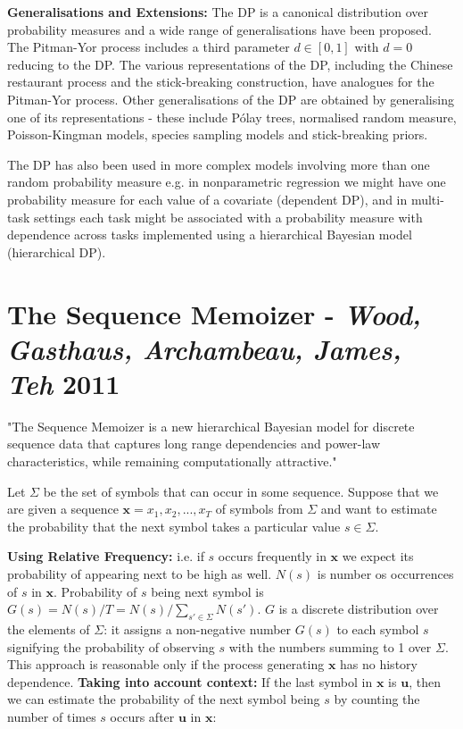 \textbf{Generalisations and Extensions:} The DP is a canonical distribution over probability measures and a wide range of generalisations have been proposed. The Pitman-Yor process includes a third parameter $d\in[0,1]$ with $d=0$ reducing to the DP. The various representations of the DP, including the Chinese restaurant process and the stick-breaking construction, have analogues for the Pitman-Yor process. Other generalisations of the DP are obtained by generalising one of its representations - these include P\'{o}lay trees, normalised random measure, Poisson-Kingman models, species sampling models and stick-breaking priors.

The DP has also been used in more complex models involving more than one random probability measure e.g. in nonparametric regression we might have one probability measure for each value of a covariate (dependent DP), and in multi-task settings each task might be associated with a probability measure with dependence across tasks implemented using a hierarchical Bayesian model (hierarchical DP).

\section{The Sequence Memoizer - \textit{Wood, Gasthaus, Archambeau, James, Teh} 2011} \label{sec:seqMem} \cite{wood2011sequence}

"The Sequence Memoizer is a new hierarchical Bayesian model for discrete sequence data that captures long range dependencies and power-law characteristics, while remaining computationally attractive."

Let $\Sigma$ be the set of symbols that can occur in some sequence. Suppose that we are given a sequence $\boldsymbol{x}=x_{1}, x_{2}, ..., x_{T}$ of symbols from $\Sigma$ and want to estimate the probability that the next symbol takes a particular value $s \in \Sigma$.

\textbf{Using Relative Frequency:} i.e. if $s$ occurs frequently in $\boldsymbol{x}$ we expect its probability of appearing next to be high as well. $N(s)$ is number os occurrences of $s$ in $\boldsymbol{x}$. Probability of $s$ being next symbol is $G(s)=N(s)/T=N(s)/\sum_{s' \in \Sigma}N(s')$. $G$ is a discrete distribution over the elements of $\Sigma$: it assigns a non-negative number $G(s)$ to each symbol $s$ signifying the probability of observing $s$ with the numbers summing to 1 over $\Sigma$. This approach is reasonable only if the process generating $\boldsymbol{x}$ has no history dependence. 
\textbf{Taking into account context:} If the last symbol in $\boldsymbol{x}$ is $\boldsymbol{u}$, then we can estimate the probability of the next symbol being $s$ by counting the number of times $s$ occurs after $\boldsymbol{u}$ in $\boldsymbol{x}$:

